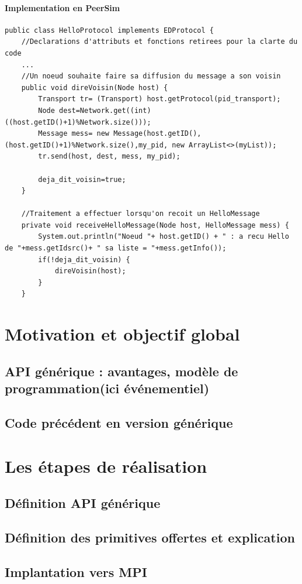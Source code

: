 \documentclass{article}
\begin{document}
				\paragraph{Implementation en PeerSim}
				\begin{lstlisting}
public class HelloProtocol implements EDProtocol {
	//Declarations d'attributs et fonctions retirees pour la clarte du code
	...
	//Un noeud souhaite faire sa diffusion du message a son voisin
	public void direVoisin(Node host) {
		Transport tr= (Transport) host.getProtocol(pid_transport);
		Node dest=Network.get((int) ((host.getID()+1)%Network.size()));
		Message mess= new Message(host.getID(),(host.getID()+1)%Network.size(),my_pid, new ArrayList<>(myList));
		tr.send(host, dest, mess, my_pid);

		deja_dit_voisin=true;
	}

	//Traitement a effectuer lorsqu'on recoit un HelloMessage
	private void receiveHelloMessage(Node host, HelloMessage mess) {
		System.out.println("Noeud "+ host.getID() + " : a recu Hello de "+mess.getIdsrc()+ " sa liste = "+mess.getInfo());
		if(!deja_dit_voisin) {
			direVoisin(host);
		}
	}
				\end{lstlisting}
		\section{Motivation et objectif global}
			\subsection{API générique : avantages, modèle de programmation(ici événementiel)}
			\subsection{Code précédent en version générique}
		
		\section{Les étapes de réalisation}
			\subsection{Définition API générique}
			\subsection{Définition des primitives offertes et explication}
			\subsection{Implantation vers MPI}
\end{document}
